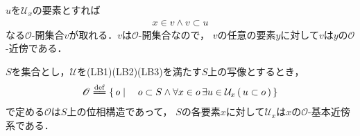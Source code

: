 \begin{description}
			\begin{sketch}
				$u$を$\mathcal{U}_{x}$の要素とすれば
				\begin{align}
					x \in v \wedge v \subset u
				\end{align}
				なる$\mathscr{O}$-開集合$v$が取れる．$v$は$\mathscr{O}$-開集合なので，
				$v$の任意の要素$y$に対して$v$は$y$の$\mathscr{O}$-近傍である．
				\QED
			\end{sketch}
	\end{description}
	
	\begin{screen}
		\begin{thm}[与えられたシステムを基本近傍系とする位相の生成]
		\label{thm:a_local_base_restores_the_topology}
			$S$を集合とし，$\mathcal{U}$を(LB1)(LB2)(LB3)を満たす$S$上の写像とするとき，
			\begin{align}
				\mathscr{O} \defeq
				\Set{o}{o \subset S \wedge \forall x \in o\, \exists u \in \mathcal{U}_{x}\, (\, u \subset o\, )}
			\end{align}
			で定める$\mathscr{O}$は$S$上の位相構造であって，
			$S$の各要素$x$に対して$\mathcal{U}_{x}$は$x$の$\mathscr{O}$-基本近傍系である．
		\end{thm}
	\end{screen}
	
